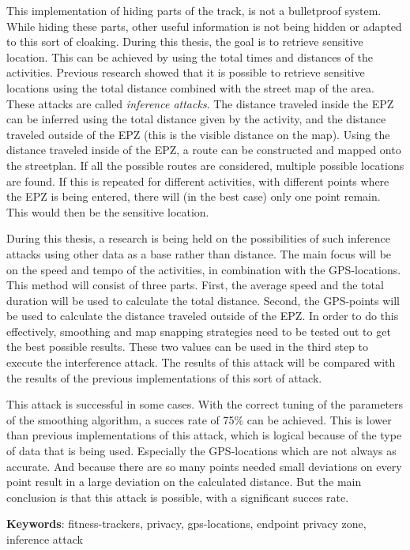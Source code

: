 This implementation of hiding parts of the track, is not a bulletproof system.
While hiding these parts, other useful information is not being hidden or
adapted to this sort of cloaking. During this thesis, the goal is to retrieve
sensitive location. This can be achieved by using the total times and distances
of the activities. Previous research showed that it is possible to retrieve
sensitive locations using the total distance combined with the street map of
the area. These attacks are called \textit{inference attacks}. The distance
traveled inside the EPZ can be inferred using the total distance given by the
activity, and the distance traveled outside of the EPZ (this is the visible
distance on the map). Using the distance traveled inside of the EPZ, a route
can be constructed and mapped onto the streetplan. If all the possible routes
are considered, multiple possible locations are found. If this is repeated for
different activities, with different points where the EPZ is being entered,
there will (in the best case) only one point remain. This would then be the
sensitive location.

During this thesis, a research is being held on the possibilities of such
inference attacks using other data as a base rather than distance. The main
focus will be on the speed and tempo of the activities, in combination with the
GPS-locations. This method will consist of three parts. First, the average
speed and the total duration will be used to calculate the total distance.
Second, the GPS-points will be used to calculate the distance traveled outside
of the \ac{EPZ}. In order to do this effectively, smoothing and map snapping
strategies need to be tested out to get the best possible results. These two
values can be used in the third step to execute the interference attack. The
results of this attack will be compared with the results of the previous
implementations of this sort of attack.

This attack is successful in some cases. With the correct tuning of the
parameters of the smoothing algorithm, a succes rate of 75\% can be achieved.
This is lower than previous implementations of this attack, which is logical
because of the type of data that is being used. Especially the GPS-locations
which are not always as accurate. And because there are so many points needed
small deviations on every point result in a large deviation on the calculated
distance. But the main conclusion is that this attack is possible, with a
significant succes rate.

\textbf{Keywords}: fitness-trackers, privacy, gps-locations, endpoint privacy zone, inference attack
